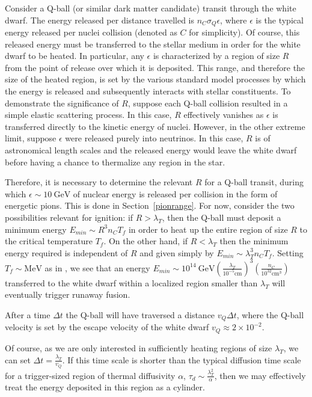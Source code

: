 \documentclass[11 pt, preprint,preprintnumbers,amsmath,amssymb, prd]{revtex4}
\newcommand{\GeV}{\text{GeV}}
\def\r{\right)}
\def\l{\left(}
\begin{document}
Consider a Q-ball (or similar dark matter candidate) transit through the white dwarf. The energy released per distance travelled is $n_C \sigma_Q \epsilon$, where $\epsilon$ is the typical energy released per nuclei collision (denoted as $C$ for simplicity). Of course, this released energy must be transferred to the stellar medium in order for the white dwarf to be heated. In particular, any $\epsilon$ is characterized by a region of size $R$ from the point of release over which it is deposited. This range, and therefore the size of the heated region, is set by the various standard model processes by which the energy is released and subsequently interacts with stellar constituents. To demonstrate the significance of $R$, suppose each Q-ball collision resulted in a simple elastic scattering process. In this case, $R$ effectively vanishes as $\epsilon$ is transferred directly to the kinetic energy of nuclei. However, in the other extreme limit, suppose $\epsilon$ were released purely into neutrinos. In this case, $R$ is of astronomical length scales and the released energy would leave the white dwarf before having a chance to thermalize any region in the star. 

Therefore, it is necessary to determine the relevant $R$ for a Q-ball transit, during which $\epsilon \sim 10 ~\GeV$ of nuclear energy is released per collision in the form of energetic pions. This is done in Section~\ref{pionrange}. For now, consider the two possibilities relevant for ignition: if $R> \lambda_T$, then the Q-ball must deposit a minimum energy $E_{min} \sim R^3 n_C T_f$ in order to heat up the entire region of size $R$ to the critical temperature $T_f$. On the other hand, if $R < \lambda_T$ then the minimum energy required is independent of $R$ and given simply by $E_{min} \sim \lambda_T^3 n_C T_f$. Setting $T_f \sim \text{MeV}$ as in \cite{Varela}, we see that an energy $E_{min} \sim 10^{14} ~\text{GeV} \l \frac{\lambda_T}{10^{-5} \text{cm}} \r^3 \l \frac{n_C}{10^{32} \text{cm}^3} \r$ transferred to the white dwarf within a localized region smaller than $\lambda_T$ will eventually trigger runaway fusion. 

After a time $\Delta t$ the Q-ball will have traversed a distance $v_Q \Delta t$, where the Q-ball velocity is set by the escape velocity of the white dwarf $v_Q \approx 2 \times 10^{-2}$. 

Of course, as we are only interested in sufficiently heating regions of size $\lambda_T$, we can set $\Delta t = \frac{\lambda_T}{v_Q}$. If this time scale is shorter than the typical diffusion time scale for a trigger-sized region of thermal diffusivity $\alpha$, $\tau_d \sim \frac{\lambda_T^2}{\alpha}$, then we may effectively treat the energy deposited in this region as a cylinder.  
\end{document}
